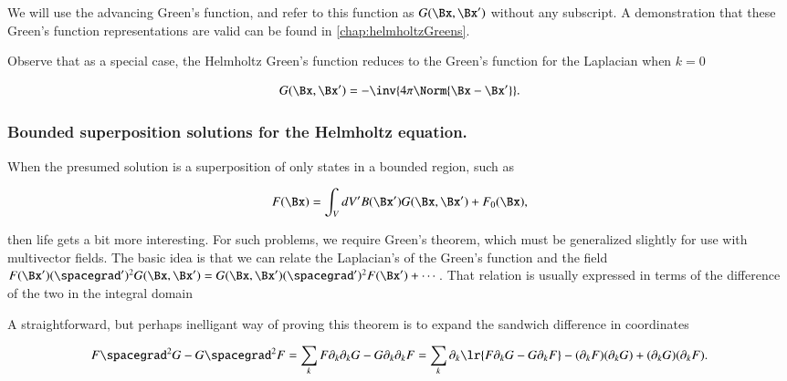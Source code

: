 We will use the advancing Green's function, and refer to this function as \( G(\Bx, \Bx') \) without any subscript.
A demonstration that these Green's function representations are valid can be found in \cref{chap:helmholtzGreens}.

Observe that as a special case, the Helmholtz Green's function reduces to the Green's function for the Laplacian when \( k = 0 \)

\begin{dmath}\label{eqn:gradientGreensFunctionEuclidean:80}
G(\Bx, \Bx') = -\inv{ 4 \pi \Norm{\Bx - \Bx'}}.
\end{dmath}

\subsubsection{Bounded superposition solutions for the Helmholtz equation.}

When the presumed solution is a superposition of only states in a bounded region, such as

\begin{dmath}\label{eqn:gradientGreensFunctionEuclidean:200}
F(\Bx) = \int_V dV' B(\Bx') G(\Bx, \Bx') + F_0(\Bx),
\end{dmath}

then life gets a bit more interesting.
For such problems, we require Green's theorem, which must be generalized slightly for use with multivector fields.
The basic idea is that we can relate the Laplacian's of the Green's function and the field
\( F(\Bx') (\spacegrad')^2 G(\Bx, \Bx') = G(\Bx, \Bx') (\spacegrad')^2 F(\Bx') + \cdots \).
That relation is usually expressed in terms of the difference of the two in the integral domain


A straightforward, but perhaps inelligant way of proving this theorem is to expand the sandwich difference in coordinates

\begin{dmath}\label{eqn:gradientGreensFunctionEuclidean:260}
F \spacegrad^2 G - G \spacegrad^2 F
=
\sum_k F \partial_k \partial_k G - G \partial_k \partial_k F
=
\sum_k \partial_k \lr{
F \partial_k G - G \partial_k F
}
-
(\partial_k F)(\partial_k G) + (\partial_k G)(\partial_k F).
\end{dmath}

